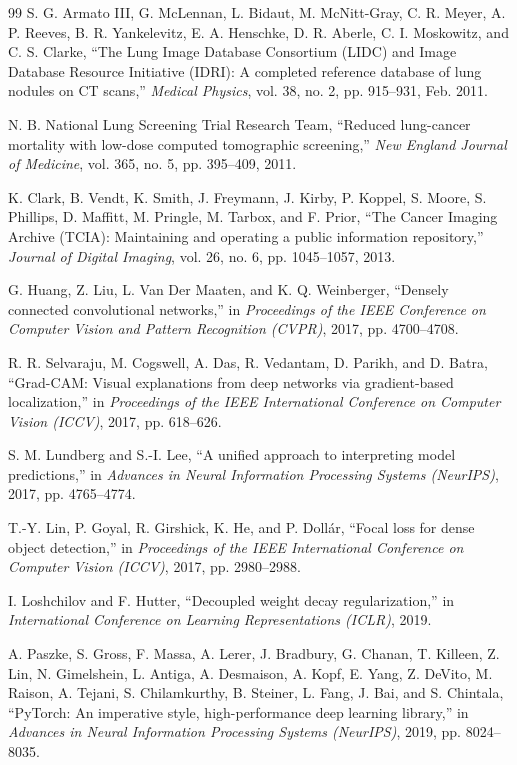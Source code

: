 ﻿\begin{thebibliography}{99}
 S. G. Armato III, G. McLennan, L. Bidaut, M. McNitt-Gray, C. R. Meyer, A. P. Reeves, B. R. Yankelevitz, E. A. Henschke, D. R. Aberle, C. I. Moskowitz, and C. S. Clarke, ``The Lung Image Database Consortium (LIDC) and Image Database Resource Initiative (IDRI): A completed reference database of lung nodules on CT scans,'' \emph{Medical Physics}, vol. 38, no. 2, pp. 915--931, Feb. 2011.

 N. B. National Lung Screening Trial Research Team, ``Reduced lung-cancer mortality with low-dose computed tomographic screening,'' \emph{New England Journal of Medicine}, vol. 365, no. 5, pp. 395--409, 2011.

 K. Clark, B. Vendt, K. Smith, J. Freymann, J. Kirby, P. Koppel, S. Moore, S. Phillips, D. Maffitt, M. Pringle, M. Tarbox, and F. Prior, ``The Cancer Imaging Archive (TCIA): Maintaining and operating a public information repository,'' \emph{Journal of Digital Imaging}, vol. 26, no. 6, pp. 1045--1057, 2013.

 G. Huang, Z. Liu, L. Van Der Maaten, and K. Q. Weinberger, ``Densely connected convolutional networks,'' in \emph{Proceedings of the IEEE Conference on Computer Vision and Pattern Recognition (CVPR)}, 2017, pp. 4700--4708.

 R. R. Selvaraju, M. Cogswell, A. Das, R. Vedantam, D. Parikh, and D. Batra, ``Grad-CAM: Visual explanations from deep networks via gradient-based localization,'' in \emph{Proceedings of the IEEE International Conference on Computer Vision (ICCV)}, 2017, pp. 618--626.

 S. M. Lundberg and S.-I. Lee, ``A unified approach to interpreting model predictions,'' in \emph{Advances in Neural Information Processing Systems (NeurIPS)}, 2017, pp. 4765--4774.

 T.-Y. Lin, P. Goyal, R. Girshick, K. He, and P. Dollár, ``Focal loss for dense object detection,'' in \emph{Proceedings of the IEEE International Conference on Computer Vision (ICCV)}, 2017, pp. 2980--2988.

 I. Loshchilov and F. Hutter, ``Decoupled weight decay regularization,'' in \emph{International Conference on Learning Representations (ICLR)}, 2019.

 A. Paszke, S. Gross, F. Massa, A. Lerer, J. Bradbury, G. Chanan, T. Killeen, Z. Lin, N. Gimelshein, L. Antiga, A. Desmaison, A. Kopf, E. Yang, Z. DeVito, M. Raison, A. Tejani, S. Chilamkurthy, B. Steiner, L. Fang, J. Bai, and S. Chintala, ``PyTorch: An imperative style, high-performance deep learning library,'' in \emph{Advances in Neural Information Processing Systems (NeurIPS)}, 2019, pp. 8024--8035.


\end{thebibliography}
